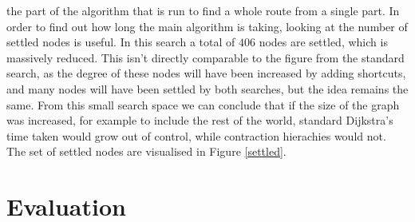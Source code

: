 \documentclass[11pt,twoside,a4paper]{report}
\begin{document}
the part of the algorithm that is run to find a whole route from a single part. In order to find out how long the main algorithm is taking, looking at the number of settled nodes is useful. In this search a total of $406$ nodes are settled, which is massively reduced. This isn't directly comparable to the figure from the standard search, as the degree
of these nodes will have been increased by adding shortcuts, and many nodes will have been settled by both searches,  but the idea remains the same. From this small search space we can conclude that if the size of the graph was increased, for example to include the rest of the world, standard Dijkstra's time taken would grow out of control, while contraction hierachies would not. 
The set of settled nodes are visualised in Figure \ref{settled}.
\chapter{Evaluation}
\end{document}
